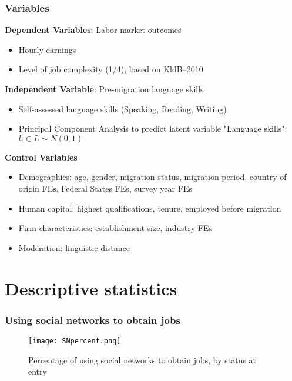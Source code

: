 \documentclass{beamer}
\begin{document}
\begin{frame}
\frametitle{Variables}

\textbf{Dependent Variables}: Labor market outcomes
\begin{itemize}
\item Hourly earnings
\item Level of job complexity (1/4), based on KldB--2010
\end{itemize}

\textbf{Independent Variable}: Pre-migration language skills
\begin{itemize}
\item Self-assessed language skills (Speaking, Reading, Writing)
\item Principal Component Analysis to predict latent variable "Language skills": $l_{i} \in L \sim N(0,1)$
\end{itemize}

\textbf{Control Variables}
\begin{itemize}
\item Demographics: age, gender, migration status, migration period, country of origin FEs, Federal States FEs, survey year FEs
\item Human capital: highest qualifications, tenure, employed before migration
\item Firm characteristics: establishment size, industry FEs
\item Moderation: linguistic distance
\end{itemize}

\end{frame}

\section{Descriptive statistics}

\begin{frame}
\frametitle{Using social networks to obtain jobs}

\begin{figure}
\centering
\texttt{[image: SNpercent.png]}
  \caption{Percentage of using social networks to obtain jobs, by status at entry}
\end{figure}

\end{frame}
\end{document}
